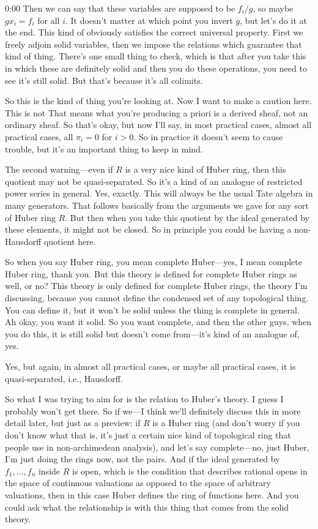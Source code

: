 \begin{unfinished}{0:00}
Then we can say that these variables are supposed to be $f_i/g$, so maybe $gx_i = f_i$ for all $i$. It doesn't matter at which point you invert $g$, but let's do it at the end. This kind of obviously satisfies the correct universal property. First we freely adjoin solid variables, then we impose the relations which guarantee that kind of thing. There's one small thing to check, which is that after you take this in which these are definitely solid and then you do these operations, you need to see it's still solid. But that's because it's all colimits.

So this is the kind of thing you're looking at. Now I want to make a caution here. This is not
That means what you're producing a priori is a derived sheaf, not an ordinary sheaf. So that's okay, but now I'll say, in most practical cases, almost all practical cases, all $\pi_i = 0$ for $i > 0$. So in practice it doesn't seem to cause trouble, but it's an important thing to keep in mind.

The second warning---even if $R$ is a very nice kind of Huber ring, then this quotient may not be quasi-separated. So it's a kind of an analogue of restricted power series in general. Yes, exactly. This will always be the usual Tate algebra in many generators. That follows basically from the arguments we gave for any sort of Huber ring $R$. But then when you take this quotient by the ideal generated by these elements, it might not be closed. So in principle you could be having a non-Hausdorff quotient here.

So when you say Huber ring, you mean complete Huber---yes, I mean complete Huber ring, thank you. But this theory is defined for complete Huber rings as well, or no? This theory is only defined for complete Huber rings, the theory I'm discussing, because you cannot define the condensed set of any topological thing. You can define it, but it won't be solid unless the thing is complete in general. Ah okay, you want it solid. So you want complete, and then the other guys, when you do this, it is still solid but doesn't come from---it's kind of an analogue of, yes.

Yes, but again, in almost all practical cases, or maybe all practical cases, it is quasi-separated, i.e., Hausdorff.

So what I was trying to aim for is the relation to Huber's theory. I guess I probably won't get there. So if we---I think we'll definitely discuss this in more detail later, but just as a preview: if $R$ is a Huber ring (and don't worry if you don't know what that is, it's just a certain nice kind of topological ring that people use in non-archimedean analysis), and let's say complete---no, just Huber, I'm just doing the rings now, not the pairs. And if the ideal generated by $f_1, \ldots, f_n$ inside $R$ is open, which is the condition that describes rational opens in the space of continuous valuations as opposed to the space of arbitrary valuations, then in this case Huber defines the ring of functions here. And you could ask what the relationship is with this thing that comes from the solid theory.


\end{unfinished}
